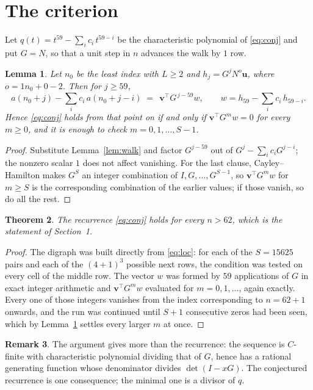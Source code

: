 \documentclass[11pt,a4paper]{article}
\theoremstyle{plain}
\newtheorem{theorem}{Theorem}
\newtheorem{lemma}[theorem]{Lemma}
\theoremstyle{definition}
\newtheorem{remark}[theorem]{Remark}
\begin{document}
\section{The criterion}

Let $q(t)=t^{59}-\sum_i c_i\,t^{59-i}$ be the characteristic polynomial of
\eqref{eq:conj} and put $G=N$, so that a unit step in $n$ advances the walk by
$1$ row.

\begin{lemma}\label{lem:crit}
Let $n_0$ be the least index with $L\ge2$ and $h_j=G^{j}N^{o}\mathbf{u}$, where
$o=1n_0+0-2$. Then for $j\ge59$,
\[
a(n_0+j)-\sum_i c_i\,a(n_0+j-i)\;=\;\,\mathbf{v}^{\!\top}G^{\,j-59}w,
\qquad w=h_{59}-\sum_i c_i\,h_{59-i} .
\]
Hence \eqref{eq:conj} holds from that point on if and only if
$\mathbf{v}^{\!\top}G^{m}w=0$ for every $m\ge0$, and it is enough to check
$m=0,1,\dots,S-1$.
\end{lemma}

\begin{proof}
Substitute Lemma~\ref{lem:walk} and factor $G^{j-59}$ out of
$G^{j}-\sum_ic_iG^{j-i}$; the nonzero scalar $1$ does not affect
vanishing. For the last clause, Cayley--Hamilton makes $G^{S}$ an integer combination of
$I,G,\dots,G^{S-1}$, so $\mathbf{v}^{\!\top}G^{m}w$ for $m\ge S$ is the corresponding
combination of the earlier values; if those vanish, so do all the rest.
\end{proof}

\begin{theorem}
The recurrence \eqref{eq:conj} holds for every $n>62$, which is the statement of
Section~1.
\end{theorem}

\begin{proof}
The digraph was built directly from \eqref{eq:loc}: for each of the $S=15625$ pairs and each
of the $(4+1)^{3}$ possible next rows, the condition was tested on every cell of
the middle row. The vector $w$ was formed by $59$ applications of $G$ in exact integer
arithmetic and $\mathbf{v}^{\!\top}G^{m}w$ evaluated for $m=0,1,\dots$, again exactly.
Every one of those integers vanishes from the index corresponding to $n=62+1$ onwards,
and the run was continued until $S+1$ consecutive zeros had been seen, which by
Lemma~\ref{lem:crit} settles every larger $m$ at once.
\end{proof}

\begin{remark}
The argument gives more than the recurrence: the sequence is $C$-finite with characteristic
polynomial dividing that of $G$, hence has a rational generating function whose denominator
divides $\det(I-xG)$. The conjectured recurrence is one consequence; the minimal one is a
divisor of $q$.
\end{remark}
\end{document}
